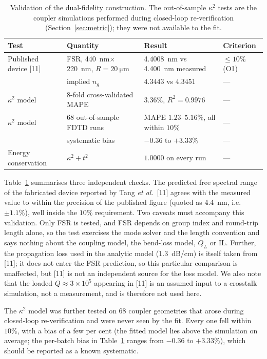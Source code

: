 \documentclass[11pt]{article}
\newcommand{\QL}{Q_L}
\begin{document}
\begin{table}[!tbp]
\centering
\caption{Validation of the dual-fidelity construction. The out-of-sample
$\kappa^2$ tests are the coupler simulations performed during closed-loop
re-verification (Section~\ref{sec:metric}); they were not available to the fit.}
\label{tab:valid}
\small
\setlength{\tabcolsep}{4pt}
\begin{tabular}{@{}llll@{}}
\toprule
Test & Quantity & Result & Criterion \\
\midrule
Published device [11] & FSR, \SI{440}{nm}$\times$\SI{220}{nm}, $R=\SI{20}{\micro\metre}$
  & \SI{4.4008}{nm} vs \SI{4.400}{nm} measured & $\le 10\%$ (O1) \\
                      & implied $n_g$ & $4.3443$ vs $4.3451$ & --- \\
$\kappa^2$ model      & 8-fold cross-validated MAPE & $3.36\%$, $R^2 = 0.9976$ & --- \\
$\kappa^2$ model      & 68 out-of-sample FDTD runs  & MAPE $1.23$--$5.16\%$, all within $10\%$ & --- \\
                      & systematic bias             & $-0.36$ to $+3.33\%$ & --- \\
Energy conservation   & $\kappa^2 + t^2$            & $1.0000$ on every run & --- \\
\bottomrule
\end{tabular}
\end{table}

Table~\ref{tab:valid} summarises three independent checks. The predicted free
spectral range of the fabricated device reported by Tang \emph{et al.}\ [11]
agrees with the measured value to within the precision of the published figure
(quoted as \SI{4.4}{nm}, i.e.\ $\pm 1.1\%$), well inside the $10\%$
requirement. Two caveats must accompany this validation. Only FSR is tested,
and FSR depends on group index and round-trip length alone, so the test
exercises the mode solver and the length convention and says nothing about the
coupling model, the bend-loss model, $\QL$ or IL. Further, the propagation
loss used in the analytic model (\SI{1.3}{dB/cm}) is itself taken from [11];
it does not enter the FSR prediction, so this particular comparison is
unaffected, but [11] is not an independent source for the loss model. We also
note that the loaded $Q \approx 3\times 10^5$ appearing in [11] is an assumed input to a crosstalk simulation, not a measurement, and is therefore
not used here.

The $\kappa^2$ model was further tested on 68 coupler geometries that arose
during closed-loop re-verification and were never seen by the fit. Every one
fell within $10\%$, with a bias of a few per cent (the fitted model lies above the simulation on average; the per-batch bias in Table~\ref{tab:valid} ranges from $-0.36$ to $+3.33\%$), which should be reported as a known systematic.
\end{document}
